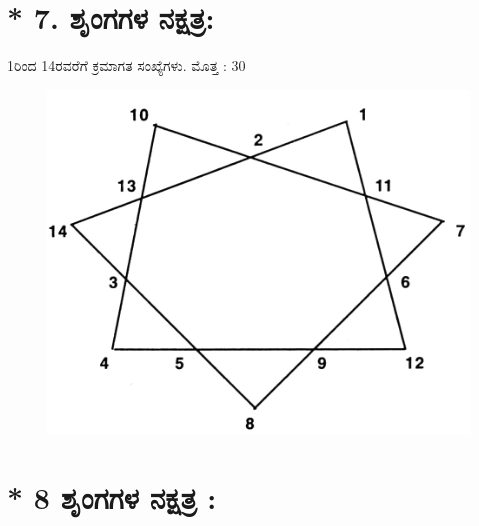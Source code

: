 \section*{* 7. ಶೃಂಗಗಳ ನಕ್ಷತ್ರ:} 

1ರಿಂದ 14ರವರೆಗೆ ಕ್ರಮಾಗತ ಸಂಖ್ಯೆಗಳು. ಮೊತ್ತ : 30
\begin{figure}[H]
\includegraphics{src/figures/chap8/fig8-5.jpg}
\end{figure}

\section*{* 8 ಶೃಂಗಗಳ ನಕ್ಷತ್ರ :}

